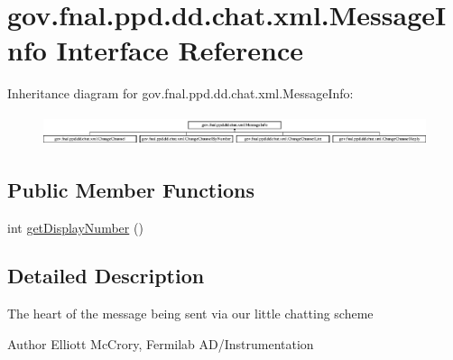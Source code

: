 \hypertarget{interfacegov_1_1fnal_1_1ppd_1_1dd_1_1chat_1_1xml_1_1MessageInfo}{\section{gov.\-fnal.\-ppd.\-dd.\-chat.\-xml.\-Message\-Info Interface Reference}
\label{interfacegov_1_1fnal_1_1ppd_1_1dd_1_1chat_1_1xml_1_1MessageInfo}
}
Inheritance diagram for gov.\-fnal.\-ppd.\-dd.\-chat.\-xml.\-Message\-Info\-:\begin{figure}[H]
\begin{center}
\leavevmode
\includegraphics[height=0.894569cm]{interfacegov_1_1fnal_1_1ppd_1_1dd_1_1chat_1_1xml_1_1MessageInfo}
\end{center}
\end{figure}
\subsection*{Public Member Functions}
\begin{DoxyCompactItemize}
\item 
int \hyperlink{interfacegov_1_1fnal_1_1ppd_1_1dd_1_1chat_1_1xml_1_1MessageInfo_aafab86ead420e9fd8dc049ef6cf453eb}{get\-Display\-Number} ()
\end{DoxyCompactItemize}


\subsection{Detailed Description}
The heart of the message being sent via our little chatting scheme

\begin{DoxyAuthor}{Author}
Elliott Mc\-Crory, Fermilab A\-D/\-Instrumentation 
\end{DoxyAuthor}


